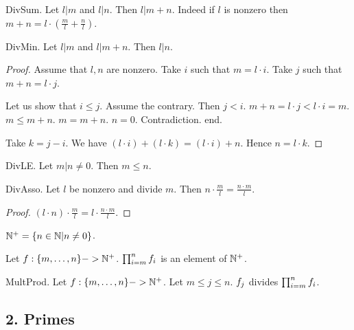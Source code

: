 \begin{lemma} DivSum.
Let $l | m$ and $l | n$. Then $l | m + n$.
Indeed if $l$ is nonzero then 
$m + n = l \cdot (\frac{m}{l} + \frac{n}{l})$.
\end{lemma}

\begin{lemma} DivMin.
Let $l | m$ and $l | m + n$. Then $l | n$.
\end{lemma}
\begin{proof}
Assume that $l,n$ are nonzero.
Take $i$ such that $m = l \cdot i$. 
Take $j$ such that $m + n = l \cdot j$.

Let us show that $i \leq j$.
Assume the contrary. Then $j < i$.
$m+n = l \cdot j < l \cdot i = m$. 
$m \leq m+n$.
$m = m+n$. $n=0$.
Contradiction. end.
 
Take $k = j - i$.
We have $(l \cdot i) + (l \cdot k) = (l \cdot i) + n$.
Hence $n = l \cdot k$.
\end{proof}

\begin{lemma} DivLE.
Let $m | n \neq 0$. Then $m \leq n$.
\end{lemma}

\begin{lemma} DivAsso.
Let $l$ be nonzero and divide $m$.
Then $n \cdot \frac{m}{l} = \frac{n \cdot m}{l}$.\end{lemma}
\begin{proof}
$(l \cdot n) \cdot \frac{m}{l} = l \cdot \frac{n \cdot m}{l}$.
\end{proof}

\begin{definitionp}
$\NNplus = \{n \in \NN | n \neq 0 \}$.
\end{definitionp}

\begin{signaturep}  
Let $f : \Seq{m}{n} -> \NNplus$.
$\Product{f}{m}{n}$ is an element of $\NNplus$.
\end{signaturep}

\begin{axiom} MultProd.
Let $f : \Seq{m}{n} -> \NNplus$.
Let $m \leq j \leq n$.
$\subfunc{f}{j}$ divides $\Product{f}{m}{n}$.
\end{axiom}

\subsection{2. Primes} 


